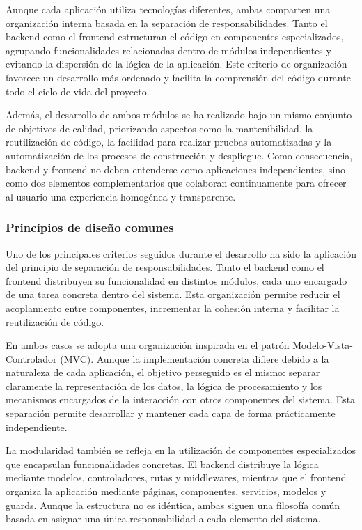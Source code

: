 Aunque cada aplicación utiliza tecnologías diferentes, ambas comparten una organización interna basada en la separación de responsabilidades. Tanto el backend como el frontend estructuran el código en componentes especializados, agrupando funcionalidades relacionadas dentro de módulos independientes y evitando la dispersión de la lógica de la aplicación. Este criterio de organización favorece un desarrollo más ordenado y facilita la comprensión del código durante todo el ciclo de vida del proyecto.

Además, el desarrollo de ambos módulos se ha realizado bajo un mismo conjunto de objetivos de calidad, priorizando aspectos como la mantenibilidad, la reutilización de código, la facilidad para realizar pruebas automatizadas y la automatización de los procesos de construcción y despliegue. Como consecuencia, backend y frontend no deben entenderse como aplicaciones independientes, sino como dos elementos complementarios que colaboran continuamente para ofrecer al usuario una experiencia homogénea y transparente.

\subsubsection{Principios de diseño comunes}

Uno de los principales criterios seguidos durante el desarrollo ha sido la aplicación del principio de separación de responsabilidades. Tanto el backend como el frontend distribuyen su funcionalidad en distintos módulos, cada uno encargado de una tarea concreta dentro del sistema. Esta organización permite reducir el acoplamiento entre componentes, incrementar la cohesión interna y facilitar la reutilización de código.

En ambos casos se adopta una organización inspirada en el patrón Modelo-Vista-Controlador (MVC). Aunque la implementación concreta difiere debido a la naturaleza de cada aplicación, el objetivo perseguido es el mismo: separar claramente la representación de los datos, la lógica de procesamiento y los mecanismos encargados de la interacción con otros componentes del sistema. Esta separación permite desarrollar y mantener cada capa de forma prácticamente independiente.

La modularidad también se refleja en la utilización de componentes especializados que encapsulan funcionalidades concretas. El backend distribuye la lógica mediante modelos, controladores, rutas y middlewares, mientras que el frontend organiza la aplicación mediante páginas, componentes, servicios, modelos y guards. Aunque la estructura no es idéntica, ambas siguen una filosofía común basada en asignar una única responsabilidad a cada elemento del sistema.

